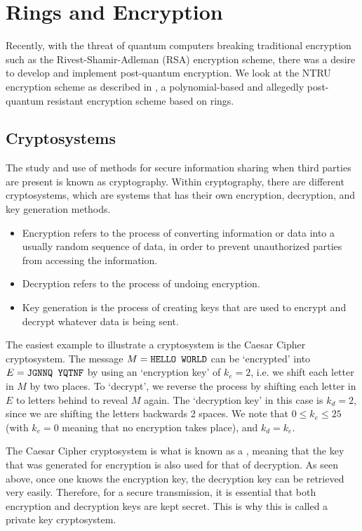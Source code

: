 \chapter{Rings and Encryption}
Recently, with the threat of quantum computers breaking traditional encryption such as the Rivest-Shamir-Adleman (RSA) encryption scheme, there was a desire to develop and implement post-quantum encryption. We look at the NTRU encryption scheme as described in \cite{hoffstein_pipher_silverman_1996}, a polynomial-based and allegedly post-quantum resistant encryption scheme based on rings.

\section{Cryptosystems}
The study and use of methods for secure information sharing when third parties are present is known as cryptography. Within cryptography, there are different cryptosystems, which are systems that has their own encryption, decryption, and key generation methods.
\begin{itemize}
    \item Encryption refers to the process of converting information or data into a usually random sequence of data, in order to prevent unauthorized parties from accessing the information.
    \item Decryption refers to the process of undoing encryption.
    \item Key generation is the process of creating keys that are used to encrypt and decrypt whatever data is being sent.
\end{itemize}

\begin{example}
    The easiest example to illustrate a cryptosystem is the Caesar Cipher cryptosystem. The message $M = \texttt{HELLO WORLD}$ can be `encrypted' into $E = \texttt{JGNNQ YQTNF}$ by using an `encryption key' of $k_e = 2$, i.e. we shift each letter in $M$ by two places. To `decrypt', we reverse the process by shifting each letter in $E$ to letters behind to reveal $M$ again. The `decryption key' in this case is $k_d = 2$, since we are shifting the letters backwards 2 spaces. We note that $0 \leq k_e \leq 25$ (with $k_e = 0$ meaning that no encryption takes place), and $k_d = k_e$.
\end{example}

The Caesar Cipher cryptosystem is what is known as a , meaning that the key that was generated for encryption is also used for that of decryption. As seen above, once one knows the encryption key, the decryption key can be retrieved very easily. Therefore, for a secure transmission, it is essential that both encryption and decryption keys are kept secret. This is why this is called a private key cryptosystem.

